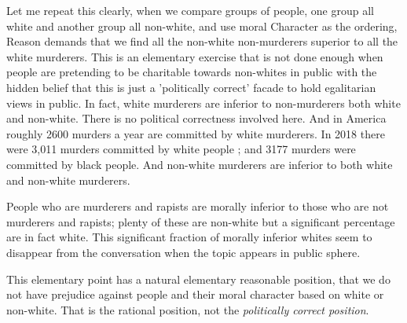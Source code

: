 \documentclass{amsart}
\begin{document}
Let me repeat this clearly, when we compare groups of people, one group all white and another group all non-white, and use moral Character as the ordering, Reason demands that we find all the non-white non-murderers superior to all the white murderers.  This is an elementary exercise that is not done enough when people are pretending to be charitable towards non-whites in public with the hidden belief that this is just a 'politically correct' facade to hold egalitarian views in public.  In fact, white murderers are inferior to non-murderers both white and non-white.  There is no political correctness involved here.  And in America roughly 2600 murders a year are committed by white murderers.  In 2018 there were 3,011 murders committed by white people \cite{FBI18}; and 3177 murders were committed by black people.  And non-white murderers are inferior to both white and non-white murderers.  

People who are murderers and rapists are morally inferior to those who are not murderers and rapists; plenty of these are non-white but a significant percentage are in fact white.  This significant fraction of morally inferior whites seem to disappear from the conversation when the topic appears in public sphere.

This elementary point has a natural elementary reasonable position, that we do not have prejudice against people and their moral character based on white or non-white.  That is the rational position, not the {\em politically correct position}.


\begin{thebibliography}{CCC}
\end{thebibliography}
\end{document}
